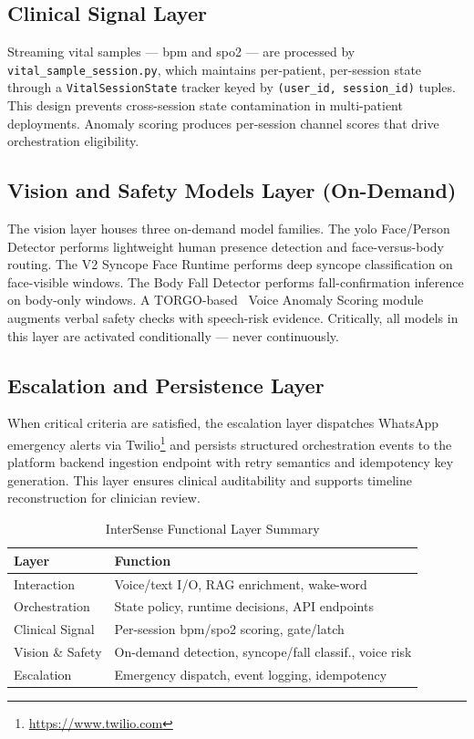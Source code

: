\documentclass[10pt,twocolumn,a4paper]{article}
\begin{document}
\subsection{Clinical Signal Layer}

Streaming vital samples — \gls{bpm} and \gls{spo2} — are processed by
\texttt{vital\_sample\_session.py}, which maintains per-patient,
per-session state through a \texttt{VitalSessionState} tracker keyed
by \texttt{(user\_id,~session\_id)} tuples.  This design prevents
cross-session state contamination in multi-patient deployments.
Anomaly scoring produces per-session channel scores that drive
orchestration eligibility.

\subsection{Vision and Safety Models Layer (On-Demand)}

The vision layer houses three on-demand model families. The \gls{yolo}
Face/Person Detector performs lightweight human presence detection and
face-versus-body routing. The V2 Syncope Face Runtime performs deep
syncope classification on face-visible windows. The Body Fall Detector
performs fall-confirmation inference on body-only windows. A
TORGO-based~\cite{rudzicz2012torgo} Voice Anomaly Scoring module augments verbal safety checks
with speech-risk evidence.  Critically, all models in this layer are
activated conditionally — never continuously.

\subsection{Escalation and Persistence Layer}

When critical criteria are satisfied, the escalation layer dispatches
WhatsApp emergency alerts via Twilio\footnote{\url{https://www.twilio.com}} and persists structured
orchestration events to the platform backend ingestion endpoint with
retry semantics and idempotency key generation.  This layer ensures
clinical auditability and supports timeline reconstruction for
clinician review.

\begin{table}[t]
  \centering
  \caption{InterSense Functional Layer Summary}
  \label{tab:layers}
  \renewcommand{\arraystretch}{1.18}
  \small
  \begin{tabularx}{\columnwidth}{@{} l >{\raggedright\arraybackslash}X @{}}
    \toprule
    \textbf{Layer} & \textbf{Function} \\
    \midrule
    Interaction       & Voice/text I/O, RAG enrichment, wake-word \\
    Orchestration     & State policy, runtime decisions, API endpoints \\
    Clinical Signal   & Per-session \gls{bpm}/\gls{spo2} scoring, gate/latch \\
    Vision \& Safety  & On-demand detection, syncope/fall classif., voice risk \\
    Escalation        & Emergency dispatch, event logging, idempotency \\
    \bottomrule
  \end{tabularx}
\end{table}
\end{document}
